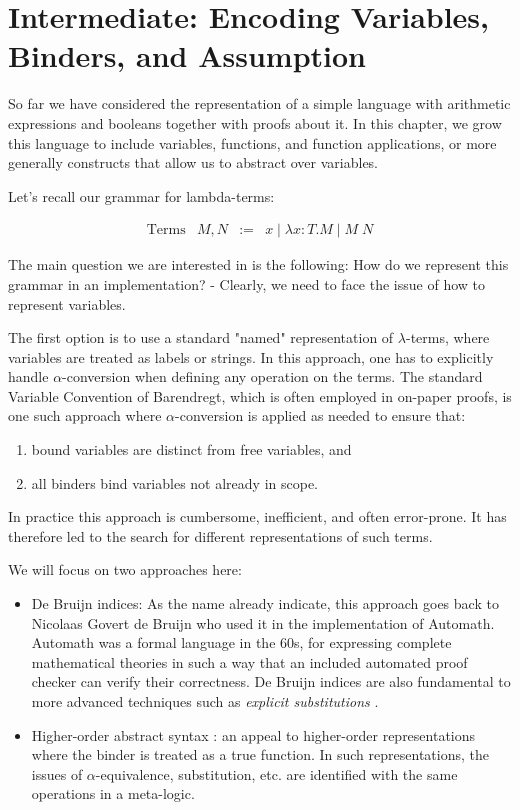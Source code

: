 \chapter{Intermediate: Encoding Variables, Binders, and Assumption}
So far we have considered the representation of a simple language with
arithmetic expressions and booleans together with proofs about it. In this
chapter, we grow this language to include variables, functions, and function applications,
or more generally constructs that allow us to abstract over variables.

Let's recall our grammar for lambda-terms:

\[
\begin{array}{llcl}
\mbox{Terms} & M, N & := & x \mid \lambda x{:}T.M \mid M\;N
\end{array}
\]

The main question we are interested in is the following: How do we
represent this grammar in an implementation? - Clearly, we need to
face the issue of how to represent variables.

The first option is to use a standard "named" representation of
$\lambda$-terms, where variables are treated as labels or strings. In
this approach, one has to explicitly handle $\alpha$-conversion when
defining any operation on the terms. The standard Variable Convention
of Barendregt, which is often employed in on-paper proofs, is one such
approach where $\alpha$-conversion is applied as needed to ensure
that:

\begin{enumerate}
\item bound variables are distinct from free variables, and
\item all binders bind variables not already in scope.
\end{enumerate}

In practice this approach is cumbersome, inefficient, and often error-prone. It
has therefore led to the search for different representations of such terms.

We will focus on two approaches here:

\begin{itemize}
\item De Bruijn indices: As the name already indicate, this approach
  goes back to Nicolaas Govert de Bruijn who used it in the
  implementation of Automath. Automath was a formal language in the
  60s, for expressing complete mathematical theories in such a way
  that an included automated proof checker can verify their
  correctness. De Bruijn indices are also fundamental to more advanced
  techniques such as \emph{explicit substitutions}
  \cite{Abadi:POPL90}.

\item Higher-order abstract syntax \cite{Pfenning88pldi}: an appeal to
  higher-order representations where the binder is treated as a true
  function. In such representations, the issues of
  $\alpha$-equivalence, substitution, etc. are identified with the
  same operations in a meta-logic.
\end{itemize}

